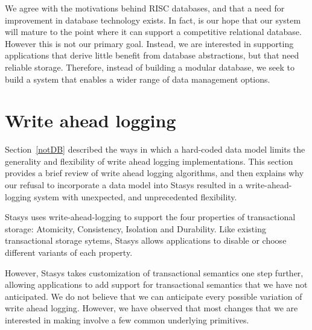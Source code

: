 \documentclass[letterpaper,twocolumn,10pt]{article}
\newcommand{\yad}{Stasys\xspace}
\begin{document}
We agree with the motivations behind RISC databases, and that a need
for improvement in database technology exists.  In fact, is our hope
that our system will mature to the point where it can support
a competitive relational database.  However this is
not our primary goal.  
Instead, we are interested in supporting applications that derive
little benefit from database abstractions, but that need reliable
storage.  Therefore, instead of building a modular database, we seek
to build a system that enables a wider range of data management options.





\section{Write ahead logging}

Section~\ref{notDB} described the ways in which a hard-coded data
model limits the generality and flexibility of write ahead logging
implementations.  This section provides a brief review of write ahead
logging algorithms, and then explains why our refusal to incorporate a
data model into \yad resulted in a write-ahead-logging system with
unexpected, and unprecedented flexibility.

\yad uses write-ahead-logging to support the
four properties of transactional storage: Atomicity, Consistency,
Isolation and Durability.  Like existing transactional storage sytems,
\yad allows applications to disable or choose different variants of each
property.

However, \yad takes customization of transactional semantics one step
further, allowing applications to add support for transactional
semantics that we have not anticipated.  We do not believe that
we can anticipate every possible variation of write ahead logging.  
However, we
have observed that most changes that we are interested in making
involve a few common underlying primitives.  
\end{document}
